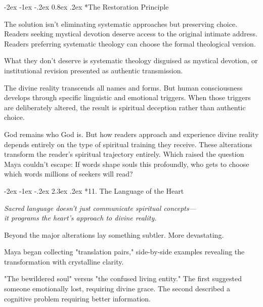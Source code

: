 \documentclass[12pt,twoside]{book}
\makeatletter
\renewcommand\section{\@startsection{section}{1}{\z@}%
{-3.5ex \@plus -1ex \@minus -.2ex}%
{2.3ex \@plus.2ex}%
{\normalfont\Large\bfseries}}
\let\oldsection\section
\renewcommand{\section}[1]{\needspace{4\baselineskip}\oldsection{#1}}
\let\oldsubsection\subsection
\renewcommand{\subsection}[1]{\needspace{3\baselineskip}\oldsubsection{#1}}
\def\cleardoublepage{\clearpage\if@twoside \ifodd\c@page\else\hbox{}\thispagestyle{empty}\newpage\if@twocolumn\hbox{}\newpage\fi\fi\fi}
\renewcommand\section{\@startsection{section}{1}{\z@}%
{-2ex \@plus -1ex \@minus -.2ex}%
{2.3ex \@plus.2ex}%
{\normalfont\Large\bfseries}}
\renewcommand\subsection{\@startsection{subsection}{2}{\z@}%
{-2ex \@plus -1ex \@minus -.2ex}%
{0.8ex \@plus .2ex}%
{\normalfont\large\bfseries}}
\makeatother
\begin{document}
\subsection*{The Restoration Principle}


The solution isn't eliminating systematic approaches but preserving choice. Readers seeking mystical devotion deserve access to the original intimate address. Readers preferring systematic theology can choose the formal theological version.

What they don't deserve is systematic theology disguised as mystical devotion, or institutional revision presented as authentic transmission.

The divine reality transcends all names and forms. But human consciousness develops through specific linguistic and emotional triggers. When those triggers are deliberately altered, the result is spiritual deception rather than authentic choice.

God remains who God is. But how readers approach and experience divine reality depends entirely on the type of spiritual training they receive. These alterations transform the reader's spiritual trajectory entirely. Which raised the question Maya couldn't escape: If words shape souls this profoundly, who gets to choose which words millions of seekers will read?


\cleardoublepage
\vspace*{0.20\textheight}
\section*{11. The Language of the Heart}
\thispagestyle{chapterpage}

{\centering\itshape Sacred language doesn't just communicate spiritual concepts—\\it programs the heart's approach to divine reality.\par}
\vspace{0.1cm}

\normalfont\justifying
Beyond the major alterations lay something subtler. More devastating.

Maya began collecting "translation pairs," side-by-side examples revealing the transformation with crystalline clarity.

"The bewildered soul" versus "the confused living entity." The first suggested someone emotionally lost, requiring divine grace. The second described a cognitive problem requiring better information.
\end{document}
